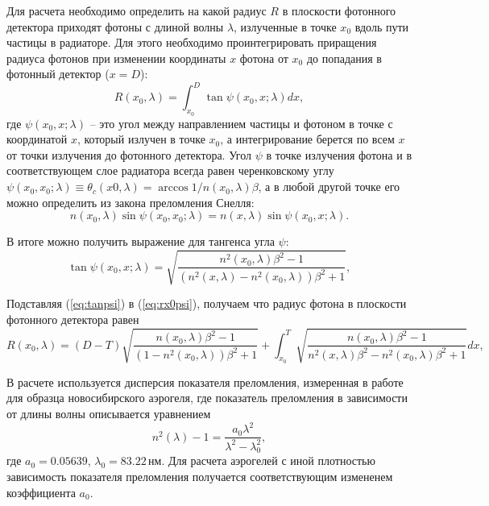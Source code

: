 \documentclass[12pt]{article}
\begin{document}
Для расчета необходимо определить на какой радиус $R$ в плоскости фотонного детектора приходят фотоны с длиной волны $\lambda$, излученные в точке $x_0$ вдоль пути частицы в
радиаторе. Для этого необходимо проинтегрировать приращения радиуса фотонов при изменении координаты $x$ фотона от $x_0$ до попадания в фотонный детектор ($x=D$):
\begin{equation}
R(x_0,\lambda) = \int_{x_0}^D \tan\psi(x_0,x;\lambda) dx,
\label{eq:rx0psi}
\end{equation}
где $\psi(x_0,x;\lambda)$ -- это угол между направлением частицы и фотоном в точке с координатой $x$, который излучен в точке $x_0$, а интегрирование берется по всем $x$ от 
точки излучения до фотонного детектора. Угол $\psi$ в точке излучения фотона и в соответствующем слое радиатора всегда равен черенковскому углу 
$\psi(x_0,x_0;\lambda) \equiv \theta_c(x0,\lambda) = \arccos{1/n(x_0,\lambda)\beta}$, а в любой другой точке его можно определить из закона преломления Снелля:
\[n(x_0,\lambda)\sin\psi(x_0,x_0;\lambda) = n(x,\lambda)\sin\psi(x_0,x;\lambda).\]

В итоге можно получить выражение для тангенса угла $\psi$:
\begin{equation}
\tan\psi(x_0,x;\lambda) = \sqrt{\frac{n^2(x_0,\lambda)\beta^2-1}{(n^2(x,\lambda)-n^2(x_0,\lambda))\beta^2+1}},
\label{eq:tanpsi}
\end{equation}

Подставляя (\ref{eq:tanpsi}) в (\ref{eq:rx0psi}), получаем что радиус фотона в плоскости фотонного детектора равен
\begin{equation}
R(x_0,\lambda) = (D-T)\sqrt{\frac{n(x_0,\lambda)\beta^2-1}{(1-n^2(x_0,\lambda))\beta^2+1}} + 
\int_{x_0}^T \sqrt{\frac{n(x_0,\lambda)\beta^2-1}{n^2(x,\lambda)\beta^2-n^2(x_0,\lambda)\beta^2+1}} dx,
\label{eq:rx0}
\end{equation}

В расчете используется дисперсия показателя преломления, измеренная в работе \cite{aerdisp} для 
образца новосибирского аэрогеля, где показатель преломления в зависимости от длины волны описывается уравнением
\[n^2(\lambda)-1 = \frac{a_0 \lambda^2}{\lambda^2-\lambda_0^2},\]
где $a_0 = 0.05639$, $\lambda_0 = 83.22\,\textrm{нм}$. 
Для расчета аэрогелей с иной плотностью зависимость показателя преломления получается соответствующим измененем 
коэффициента $a_0$.
\end{document}
